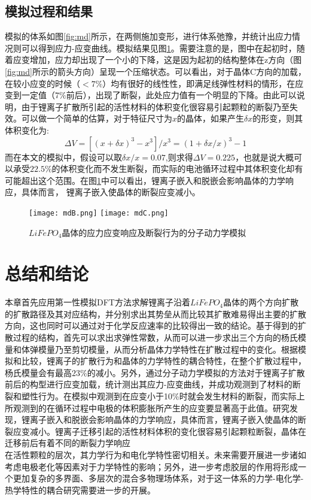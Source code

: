 \subsection{模拟过程和结果}
模拟的体系如图\ref{fig:md}所示，在两侧施加变形，进行体系弛豫，并统计出应力情况则可以得到应力-应变曲线。模拟结果见图\ref{fig:md_result}。需要注意的是，图中在起初时，随着应变增加，应力却出现了一个小的下降，这是因为起初的结构整体在z方向（图\ref{fig:md}所示的箭头方向）呈现一个压缩状态。可以看出，对于晶体C方向的加载，在较小应变的时候（$<7\%$）均有很好的线性性，即满足线弹性材料的情形，在应变到一定值（$7\%$前后），出现了断裂，此处应力值有一个明显的下降。由此可以说明，由于锂离子扩散所引起的活性材料的体积变化很容易引起颗粒的断裂乃至失效。可以做一个简单的估算，对于特征尺寸为$x$的晶体，如果产生$\delta x$的形变，则其体积变化为:
\begin{equation}
\Delta V = [(x+\delta x)^3 - x^3]/x^3 = (1+ \delta x/x)^3 -1
\end{equation}
而在本文的模拟中，假设可以取$\delta x/x = 0.07$,则求得$\Delta V=0.225$，也就是说大概可以承受$22.5\%$的体积变化而不发生断裂，而实际的电池循环过程中其体积变化却有可能超出这个范围\cite{Zhang2017Chemomechanical}。在图\ref{fig:md_result}中可以看出，锂离子嵌入和脱嵌会影响晶体的力学响应，具体而言，
锂离子嵌入使晶体的断裂应变减小。
\begin{figure}
	\centering   
	\texttt{[image: mdB.png]}
	\texttt{[image: mdC.png]}
	\caption{$LiFePO_4$晶体的应力应变响应及断裂行为的分子动力学模拟} 
	\label{fig:md_result}
\end{figure}

\section{总结和结论}
本章首先应用第一性模拟DFT方法求解锂离子沿着$LiFePO_4$晶体的两个方向扩散的扩散路径及其对应结构，并分别求出其势垒从而比较其扩散难易得出主要的扩散方向，这也同时可以通过对于化学反应速率的比较得出一致的结论。基于得到的扩散过程的结构，首先可以求出求弹性常数，从而可以进一步求出三个方向的杨氏模量和体弹模量乃至剪切模量，从而分析晶体力学特性在扩散过程中的变化。根据模拟和比较，锂离子的扩散行为和晶体的力学特性的耦合特性，在整个扩散过程中，杨氏模量会有最高$23\%$的减小。另外，通过分子动力学模拟的方法对于锂离子扩散前后的构型进行应变加载，统计测出其应力-应变曲线，并成功观测到了材料的断裂和塑性行为。在模拟中观测到在应变小于10\%时就会发生材料的断裂，而实际上所观测到的在循环过程中电极的体积膨胀所产生的应变要显著高于此值。研究发现，锂离子嵌入和脱嵌会影响晶体的力学响应，具体而言，锂离子嵌入使晶体的断裂应变减小。锂离子迁移引起的活性材料体积的变化很容易引起颗粒断裂，晶体在迁移前后有着不同的断裂力学响应
\\
\indent 在活性颗粒的层次，其力学行为和电化学特性密切相关。未来需要开展进一步诸如考虑电极老化等因素对于力学特性的影响；另外，进一步考虑胶层的作用将形成一个更加复杂的多界面、多层次的混合多物理场体系，对于这一体系的力学-电化学-热学特性的耦合研究需要进一步的开展。